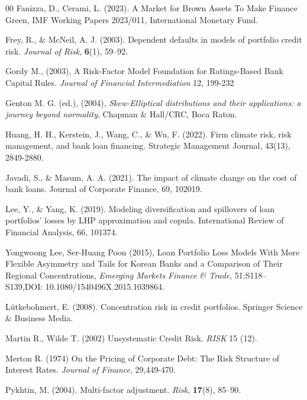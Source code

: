 \documentclass[preprint,12pt]{article}
\begin{document}
\begin{thebibliography}{00}
 Fanizza, D., Cerami, L. (2023). A Market for Brown Assets To Make Finance Green, IMF Working Papers 2023/011, International Monetary Fund.

Frey, R., \& McNeil, A. J. (2003). Dependent defaults in models of portfolio credit risk. \textit{Journal of Risk}, \textbf{6}(1), 59--92.

 Gordy M., (2003), A Risk-Factor Model Foundation for Ratings-Based Bank Capital Rules. \emph{Journal of Financial Intermediation} 12, 199-232

 Genton M. G. (ed.), (2004), \emph{Skew-Elliptical distributions and their applications: a journey beyond normality},  Chapman $\&$ Hall/CRC, Boca Raton.

 Huang, H. H., Kerstein, J., Wang, C., \& Wu, F. (2022). Firm climate risk, risk management, and bank loan financing. Strategic Management Journal, 43(13), 2849-2880.

 Javadi, S., \& Masum, A. A. (2021). The impact of climate change on the cost of bank loans. Journal of Corporate Finance, 69, 102019.

 Lee, Y., \& Yang, K. (2019). Modeling diversification and spillovers of loan portfolios' losses by LHP approximation and copula. International Review of Financial Analysis, 66, 101374.

 Yongwoong Lee, Ser-Huang Poon (2015), Loan Portfolio Loss Models With More Flexible Asymmetry and Tails for Korean Banks and a Comparison of Their Regional Concentrations, \emph{Emerging Markets Finance \& Trade}, 51:S118–S139,DOI: 10.1080/1540496X.2015.1039864.

 L\"utkebohmert, E. (2008). Concentration risk in credit portfolios. Springer Science \& Business Media.

 Martin R., Wilde T. (2002) Unsystematic Credit Risk. \emph{RISK} 15 (12).

  Merton R. (1974) On the Pricing of Corporate Debt: The Risk Structure of Interest Rates. \emph{Journal of Finance}, 29,449-470.

 Pykhtin, M. (2004). Multi-factor adjustment. \textit{Risk}, \textbf{17}(8), 85--90.




\end{thebibliography}
\end{document}
